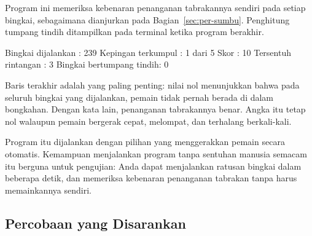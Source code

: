 Program ini memeriksa kebenaran penanganan tabrakannya sendiri pada setiap
bingkai, sebagaimana dianjurkan pada Bagian~\ref{sec:per-sumbu}. Penghitung
tumpang tindih ditampilkan pada terminal ketika program berakhir.

\begin{kodekeluaran}
Bingkai dijalankan       : 239
Kepingan terkumpul       : 1 dari 5
Skor                     : 10
Tersentuh rintangan      : 3
Bingkai bertumpang tindih: 0
\end{kodekeluaran}

Baris terakhir adalah yang paling penting: nilai nol menunjukkan bahwa pada
seluruh bingkai yang dijalankan, pemain tidak pernah berada di dalam
bongkahan. Dengan kata lain, penanganan tabrakannya benar. Angka itu tetap nol
walaupun pemain bergerak cepat, melompat, dan terhalang berkali-kali.

\begin{catatabox}
Program itu dijalankan dengan pilihan  yang
menggerakkan pemain secara otomatis. Kemampuan menjalankan program tanpa
sentuhan manusia semacam itu berguna untuk pengujian: Anda dapat menjalankan
ratusan bingkai dalam beberapa detik, dan memeriksa kebenaran penanganan
tabrakan tanpa harus memainkannya sendiri.
\end{catatabox}

\subsection{Percobaan yang Disarankan}

